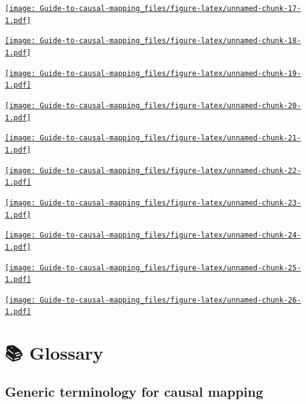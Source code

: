 \documentclass[
]{book}
\begin{document}
\href{https://player.vimeo.com/video/596497752}{\texttt{[image: Guide-to-causal-mapping\_files/figure-latex/unnamed-chunk-17-1.pdf]}}

\href{https://player.vimeo.com/video/580212681}{\texttt{[image: Guide-to-causal-mapping\_files/figure-latex/unnamed-chunk-18-1.pdf]}}

\href{https://player.vimeo.com/video/636997200}{\texttt{[image: Guide-to-causal-mapping\_files/figure-latex/unnamed-chunk-19-1.pdf]}}

\href{https://player.vimeo.com/video/651173445}{\texttt{[image: Guide-to-causal-mapping\_files/figure-latex/unnamed-chunk-20-1.pdf]}}

\href{https://player.vimeo.com/video/604138709}{\texttt{[image: Guide-to-causal-mapping\_files/figure-latex/unnamed-chunk-21-1.pdf]}}

\href{https://player.vimeo.com/video/664879474}{\texttt{[image: Guide-to-causal-mapping\_files/figure-latex/unnamed-chunk-22-1.pdf]}}

\href{https://player.vimeo.com/video/599620015}{\texttt{[image: Guide-to-causal-mapping\_files/figure-latex/unnamed-chunk-23-1.pdf]}}

\href{https://player.vimeo.com/video/671894620}{\texttt{[image: Guide-to-causal-mapping\_files/figure-latex/unnamed-chunk-24-1.pdf]}}

\href{https://player.vimeo.com/video/637121851}{\texttt{[image: Guide-to-causal-mapping\_files/figure-latex/unnamed-chunk-25-1.pdf]}}

\href{https://player.vimeo.com/video/683770170}{\texttt{[image: Guide-to-causal-mapping\_files/figure-latex/unnamed-chunk-26-1.pdf]}}

\hypertarget{glossary}{%
\chapter{📚 Glossary}\label{glossary}}

\hypertarget{generic-terminology-for-causal-mapping}{%
\section{Generic terminology for causal mapping}\label{generic-terminology-for-causal-mapping}}
\end{document}
